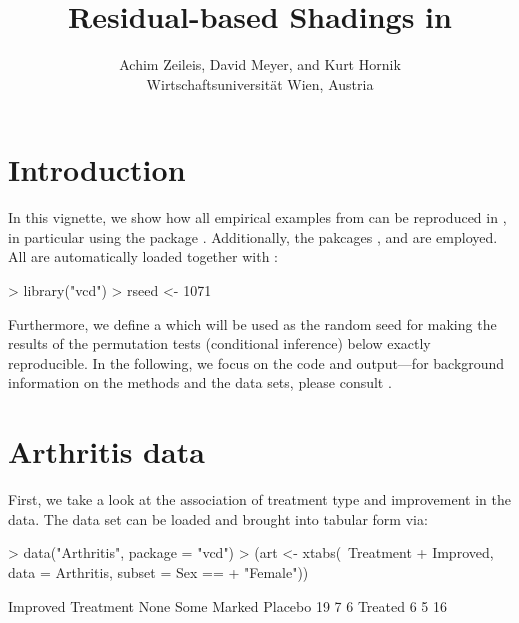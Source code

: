 \documentclass{Z}
\title{Residual-based Shadings in \pkg{vcd}}
\author{Achim Zeileis, David Meyer, \textnormal{and} Kurt Hornik\\Wirtschaftsuniversit\"at Wien, Austria}
\begin{document}



\section{Introduction} \label{sec:intro}

In this vignette, we show how all empirical examples from \cite{vcd:Zeileis+Meyer+Hornik:2005}
can be reproduced in \citep[\mbox{\url{http://www.R-project.org/}}]{vcd:R:2006},
in particular using the package  \citep{vcd:Meyer+Zeileis+Hornik:2006}. Additionally,
the pakcages  \citep[see][]{vcd:Venables+Ripley:2002},
 \citep[see][]{vcd:Murrell:2002} and  \citep{vcd:Ihaka:2004}
are employed. All are automatically loaded together with :

\begin{Schunk}
\begin{Sinput}
> library("vcd")
> rseed <- 1071
\end{Sinput}
\end{Schunk}

Furthermore, we define a  which will be used as the random seed for making
the results of the permutation tests (conditional inference) below exactly reproducible.
In the following, we focus on the  code and output---for background information
on the methods and the data sets, please consult \cite{vcd:Zeileis+Meyer+Hornik:2005}.

\section{Arthritis data} \label{sec:arthritis}

First, we take a look at the association of treatment type and improvement in the
 data. The data set can be loaded and brought into tabular form
via:

\begin{Schunk}
\begin{Sinput}
> data("Arthritis", package = "vcd")
> (art <- xtabs(~Treatment + Improved, data = Arthritis, subset = Sex == 
+     "Female"))
\end{Sinput}
\begin{Soutput}
         Improved
Treatment None Some Marked
  Placebo   19    7      6
  Treated    6    5     16
\end{Soutput}
\end{Schunk}
\end{document}
